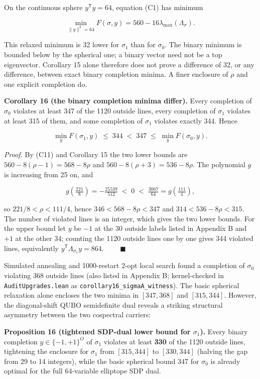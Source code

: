 \documentclass[11pt,a4paper]{article}
\newcommand{\lt}{<}
\begin{document}
On the continuous sphere \(y^{\mathsf T}y=64\), equation (C1) has minimum

\[\min_{\|y\|^2=64}F(\sigma,y)=560-16\lambda_{\max}(\Lambda_\sigma).
\tag{C11}\]

This relaxed minimum is 32 lower for \(\sigma_1\) than for \(\sigma_0\). The binary minimum is bounded
below by the spherical one; a binary vector need not be a top eigenvector. Corollary 15 alone
therefore does not prove a difference of 32, or any difference, between exact binary completion
minima. A finer enclosure of \(\rho\) and one explicit completion do.

\textbf{Corollary 16 (the binary completion minima differ).} Every completion of \(\sigma_0\) violates at
least 347 of the 1120 outside lines, every completion of \(\sigma_1\) violates at least 315 of them, and
some completion of \(\sigma_1\) violates exactly 344. Hence

\[\min_y F(\sigma_1,y)\;\le\;344\;<\;347\;\le\;\min_y F(\sigma_0,y).
\tag{C12}\]

\emph{Proof.} By (C11) and Corollary 15 the two lower bounds are \(560-8(\rho-1)=568-8\rho\) and
\(560-8(\rho+3)=536-8\rho\). The polynomial \(g\) is increasing from 25 on, and

\[g\!\left(\tfrac{221}{8}\right)=-\tfrac{25539}{512}\;<\;0\;<\;\tfrac{3067}{64}=g\!\left(\tfrac{111}{4}\right),\]

so \(221/8\lt\rho\lt111/4\), hence \(346\lt568-8\rho\lt347\) and \(314\lt536-8\rho\lt315\). The number of
violated lines is an integer, which gives the two lower bounds. For the upper bound let \(y\) be \(-1\) at
the 30 outside labels listed in Appendix B and \(+1\) at the other 34; counting the 1120 outside lines
one by one gives 344 violated lines, equivalently \(y^{\mathsf T}\Lambda_{\sigma_1}y=864\).
\(\qquad\blacksquare\)

Simulated annealing and 1000-restart 2-opt local search found a completion of \(\sigma_0\) violating 368
outside lines (also listed in Appendix B; kernel-checked in \nolinkurl{AuditUpgrades.lean} as
\nolinkurl{corollary16_sigmaA_witness}). The basic spherical relaxation alone encloses the two minima in
\([347,368]\) and \([315,344]\). However, the diagonal-shift QUBO semidefinite dual reveals a striking
structural asymmetry between the two cospectral carriers:

\textbf{Proposition 16\textquotesingle{} (tightened SDP-dual lower bound for \(\sigma_1\)).} Every binary completion
\(y\in\{-1,+1\}^O\) of \(\sigma_1\) violates at least \textbf{330} of the 1120 outside lines, tightening the
enclosure for \(\sigma_1\) from \([315,344]\) to \textbf{\([330,344]\)} (halving the gap from 29 to 14 integers),
while the basic spherical bound 347 for \(\sigma_0\) is already optimal for the full 64-variable
elliptope SDP dual.
\end{document}
